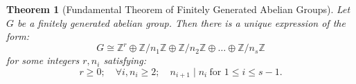 \documentclass[12pt]{article}
\newtheorem{thm}{Theorem}
\newcommand{\Ints}{\mathbb{Z}}
\begin{document}
\begin{thm}[Fundamental Theorem of Finitely Generated Abelian
Groups]

Let $G$ be a finitely generated abelian group. Then there is a
unique expression of the form: $$G\cong
\Ints^{r}\oplus\Ints/n_1\Ints\oplus\Ints/n_2\Ints\oplus\ldots\oplus\Ints/n_s\Ints$$
for some integers $r,n_i$ satisfying:
$$r\geq 0;\quad \forall i, n_i\geq 2;\quad n_{i+1}\mid n_i\ \text{for }
1\leq i\leq s-1.$$
\end{thm}
\end{document}
